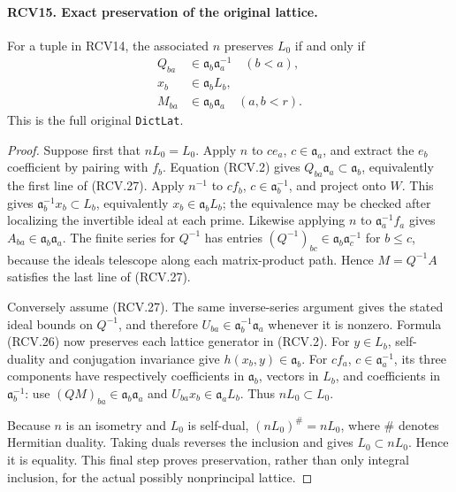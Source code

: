 \documentclass[11pt,a4paper]{article}
\numberwithin{equation}{section}
\theoremstyle{remark}\newtheorem{remark}[theorem]{Remark}
\begin{document}
\paragraph{RCV15. Exact preservation of the original lattice.}
\label{claim:RCV15}
For a tuple in RCV14, the associated \(n\) preserves \(L_0\)
if and only if
\[
 \begin{split}
 Q_{ba}&\in\mathfrak a_b\mathfrak a_a^{-1}\quad(b<a),\\
 x_b&\in\mathfrak a_b L_b,\\
 M_{ba}&\in\mathfrak a_b\mathfrak a_a\quad(a,b<r).
 \end{split}
\tag{RCV.27}
\]
This is the full original \texttt{Dict\allowbreak Lat}.
\begin{proof}
Suppose first that \(nL_0=L_0\).  Apply \(n\) to
\(c e_a\), \(c\in\mathfrak a_a\), and extract the \(e_b\)
coefficient by pairing with \(f_b\).  Equation (RCV.2) gives
\(Q_{ba}\mathfrak a_a\subset\mathfrak a_b\), equivalently
the first line of (RCV.27).  Apply \(n^{-1}\) to
\(c f_b\), \(c\in\mathfrak a_b^{-1}\), and project onto
\(W\).  This gives \(\mathfrak a_b^{-1}x_b\subset L_b\),
equivalently \(x_b\in\mathfrak a_bL_b\); the equivalence may
be checked after localizing the invertible ideal at each prime.
Likewise applying \(n\) to \(\mathfrak a_a^{-1}f_a\)
gives \(A_{ba}\in\mathfrak a_b\mathfrak a_a\).
The finite series for \(Q^{-1}\) has entries
\((Q^{-1})_{bc}\in\mathfrak a_b\mathfrak a_c^{-1}\)
for \(b\leq c\), because the ideals telescope along each
matrix-product path.  Hence \(M=Q^{-1}A\) satisfies the last
line of (RCV.27).

Conversely assume (RCV.27).  The same inverse-series argument
gives the stated ideal bounds on \(Q^{-1}\), and therefore
\(U_{ba}\in\mathfrak a_b^{-1}\mathfrak a_a\) whenever it
is nonzero.  Formula (RCV.26) now preserves each lattice generator
in (RCV.2).  For \(y\in L_b\), self-duality and conjugation
invariance give \(h(x_b,y)\in\mathfrak a_b\).
For \(c f_a\), \(c\in\mathfrak a_a^{-1}\), its three
components have respectively coefficients in \(\mathfrak a_b\),
vectors in \(L_b\), and coefficients in \(\mathfrak a_b^{-1}\):
use \((QM)_{ba}\in\mathfrak a_b\mathfrak a_a\) and
\(U_{ba}x_b\in\mathfrak a_aL_b\).  Thus \(nL_0\subset L_0\).

Because \(n\) is an isometry and \(L_0\) is self-dual,
\((nL_0)^{\#}=nL_0\), where \(\#\) denotes Hermitian
duality.  Taking duals reverses the inclusion and gives
\(L_0\subset nL_0\).  Hence it is equality.  This final step
proves preservation, rather than only integral inclusion, for the
actual possibly nonprincipal lattice.
\end{proof}
\end{document}
